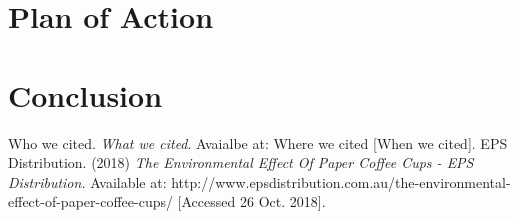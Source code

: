 \documentclass[letterpaper,11pt]{texMemo}
\begin{document}
\section*{Plan of Action}

\section*{Conclusion}

\begin{thebibliography}{9}
	Who we cited.
	\textit{What we cited}.
	Avaialbe at: Where we cited
	[When we cited].
	EPS Distribution. (2018)
	\textit{The Environmental Effect Of Paper Coffee Cups \-- EPS Distribution.}
	Available at:
	http://www.epsdistribution.com.au/the-environmental-effect-of-paper-coffee-cups/
	[Accessed 26 Oct. 2018].

\end{thebibliography}
\end{document}
